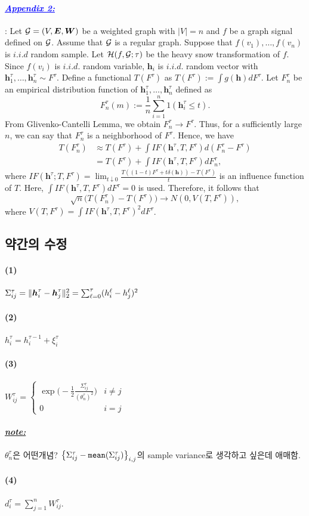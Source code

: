 \documentclass[12pt,oneside,english,a4paper]{article}
\def\note{\paragraph{\LARGE\textit{\underline{note:}}}\LARGE}
\newcommand{\parablue}[1]{\paragraph{\LARGE\textcolor{blue}{\it\underline{\textbf{#1:}}}}\LARGE}
\def\one{\paragraph{\large(1)}\LARGE}
\def\two{\paragraph{\LARGE(2)}\LARGE}
\def\three{\paragraph{\LARGE(3)}\LARGE}
\def\four{\paragraph{\LARGE(4)}\LARGE}
\newcommand{\bsh}{\mbox{\boldmath $h$}}
\begin{document}
\parablue{Appendix 2}:
Let ${\cal G}=(V,{\boldsymbol E},{\boldsymbol W})$ be a weighted graph with $|V|=n$ and $f$ be a graph signal defined on ${\cal G}$. Assume that ${\cal G}$ is a regular graph. Suppose that $f(v_1),\dots,f(v_n)$ is $i.i.d$ random sample. Let ${\cal H}(f,{\cal G}; \tau)$ be the heavy snow transformation of $f$. Since $f(v_i)$ is $i.i.d.$ random variable, ${\boldsymbol h}_i$ is $i.i.d.$ random vector with 
$
{\boldsymbol h}_1^{\tau},\dots,{\boldsymbol h}_n^{\tau} \sim F^{\tau}.
$ 
Define a functional $T(F^{\tau})$ as 
$
T(F^{\tau}):=\int g({\boldsymbol h}) dF^{\tau}.
$
Let $F_n^{\tau}$ be an empirical distribution function of ${\boldsymbol h}_1^{\tau},\dots,{\boldsymbol h}_n^{\tau}$ defined as  
\[
F_n^{\tau}(m) :=\frac{1}{n}\sum_{i=1}^{n}1({\boldsymbol h}^{\tau}_i\leq t).
\]
From Glivenko-Cantelli Lemma,  we obtain $F_n^{\tau} \to F^{\tau}$. Thus, for a sufficiently large $n$, we can say that $F_n^{\tau}$ is a neighborhood of $F^{\tau}$. Hence, we have 
\begin{align*}
T(F_n^{\tau}) & \approx  T(F^{\tau})+\int IF(\boldsymbol{h}^{\tau},T,F^{\tau})d(F_n^{\tau}-F^{\tau}) \\
& = T(F^{\tau})+\int IF(\boldsymbol{h}^{\tau},T,F^{\tau}) dF_n^{\tau}, 
\end{align*}
where $IF({\boldsymbol h}^{\tau}; T,F^{\tau})= \lim_{t\downarrow 0}\frac{T((1-t)F^{\tau} + t \delta(\boldsymbol{h}) )-T(F^{\tau})}{t}$ is an influence function of $T$. Here, $\int IF(\boldsymbol{h}^{\tau},T,F^{\tau})dF^{\tau}=0$ is used. Therefore, it follows that  
\[
\sqrt{n}\Big(T(F_n^{\tau})-T(F^{\tau}) \Big) \to N(0,V(T,F^{\tau})), 
\]
where $V(T,F^{\tau})=\int IF(\boldsymbol{h}^{\tau},T,F^{\tau})^2 dF^{\tau}$. 

\subsection{약간의 수정}
\one $\Sigma_{ij}^{\tau}=\|\bsh_i^{\tau}-\bsh_j^{\tau}\|_2^2=\sum_{\ell=0}^{\tau}(h_i^\ell-h_j^\ell)^2$
\two $h_i^{\tau}=h_i^{\tau-1}+\xi_i^{\tau}$
\three $W_{ij}^{\tau}=\begin{cases}\exp\big(-\frac{1}{2}\frac{\Sigma_{ij}^{\tau}}{(\theta_n^{\tau})^2}\big) & i\neq j \\ 0 & i=j \end{cases}$
\note $\theta_n^{\tau}$은 어떤개념? $\big\{\Sigma_{ij}^{\tau}-{\tt mean}(\Sigma_{ij}^{\tau})\big\}_{i,j}$의 sample variance로 생각하고 
싶은데 애매함. 

\four $d_i^{\tau}=\sum_{j=1}^{n}W_{ij}^{\tau}$. 
\end{document}
